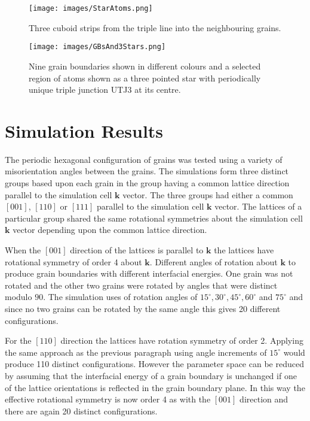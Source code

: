 \documentclass[12pt,a4paper]{book}
\begin{document}
\begin{figure}
	\texttt{[image: images/StarAtoms.png]} 
	\label{fig:StarAtoms}
	\caption{Three cuboid strips from the triple line into the
	neighbouring grains.}
\end{figure}


\begin{figure}
	\texttt{[image: images/GBsAnd3Stars.png]} 
	\label{fig:GBsandStar}
	\caption{Nine grain boundaries shown in different colours and a selected region of atoms shown as a three pointed star with periodically unique triple junction UTJ3 at its centre.}
	   
\end{figure}


\chapter{Simulation Results} \label{sec:SimulationResults}

The periodic hexagonal configuration of grains was tested using a variety of misorientation angles between the grains.  The simulations form three distinct groups based upon each grain in the group having a common lattice direction parallel to the simulation cell $\mathbf{k}$ vector. The three groups had either a common $[0 0 1]$, $[1 1 0]$ or $[1 1 1]$ parallel to the simulation cell $\mathbf{k}$ vector. The lattices of a particular group shared the same rotational symmetries about the simulation cell $\mathbf{k}$ vector depending upon the common lattice direction.

When the $[0 0 1]$ direction of the lattices is parallel to $\mathbf{k}$ the lattices have rotational symmetry of order 4 about $\mathbf{k}$.  Different angles of rotation about $\mathbf{k}$ to produce grain boundaries with different interfacial energies. One grain was not rotated and the other two grains were rotated by angles that were distinct modulo $90$. The simulation uses of rotation angles of $15^{\circ},30^{\circ},45^{\circ},60^{\circ}$ and $75^{\circ}$ and since no two grains can be rotated by the same angle this gives 20 different configurations.

For the $[1 1 0]$ direction the lattices have rotation symmetry of order 2. Applying the same approach as the previous paragraph using angle increments of $15^{\circ}$ would produce 110 distinct configurations. However the parameter space can be reduced by assuming that the interfacial energy of a grain boundary is unchanged if one of the lattice orientations is reflected in the grain boundary plane. In this way the effective rotational symmetry is now order 4 as with the $[0 0 1]$ direction and there are again 20 distinct configurations.  
\end{document}

